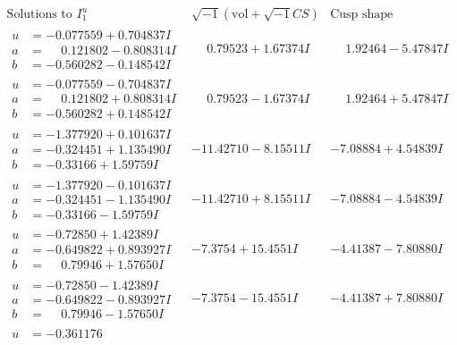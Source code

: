 \documentclass[1p]{elsarticle_modified}
\theoremstyle{definition}
\newcommand{\I}{\sqrt{-1}}
\begin{document}
$$\begin{array}{c|c|c}  
\text{Solutions to }I^u_{1}& \I (\text{vol} + \sqrt{-1}CS) & \text{Cusp shape}\\
 \hline 
\begin{aligned}
u &= -0.077559 + 0.704837 I \\
a &= \phantom{-}0.121802 - 0.808314 I \\
b &= -0.560282 - 0.148542 I\end{aligned}
 & \phantom{-}0.79523 + 1.67374 I & \phantom{-}1.92464 - 5.47847 I \\ \hline\begin{aligned}
u &= -0.077559 - 0.704837 I \\
a &= \phantom{-}0.121802 + 0.808314 I \\
b &= -0.560282 + 0.148542 I\end{aligned}
 & \phantom{-}0.79523 - 1.67374 I & \phantom{-}1.92464 + 5.47847 I \\ \hline\begin{aligned}
u &= -1.377920 + 0.101637 I \\
a &= -0.324451 + 1.135490 I \\
b &= -0.33166 + 1.59759 I\end{aligned}
 & -11.42710 - 8.15511 I & -7.08884 + 4.54839 I \\ \hline\begin{aligned}
u &= -1.377920 - 0.101637 I \\
a &= -0.324451 - 1.135490 I \\
b &= -0.33166 - 1.59759 I\end{aligned}
 & -11.42710 + 8.15511 I & -7.08884 - 4.54839 I \\ \hline\begin{aligned}
u &= -0.72850 + 1.42389 I \\
a &= -0.649822 + 0.893927 I \\
b &= \phantom{-}0.79946 + 1.57650 I\end{aligned}
 & -7.3754 + 15.4551 I & -4.41387 - 7.80880 I \\ \hline\begin{aligned}
u &= -0.72850 - 1.42389 I \\
a &= -0.649822 - 0.893927 I \\
b &= \phantom{-}0.79946 - 1.57650 I\end{aligned}
 & -7.3754 - 15.4551 I & -4.41387 + 7.80880 I \\ \hline\begin{aligned}
u &= -0.361176\phantom{ +0.000000I} \\

\end{aligned}
\end{array}$$
\end{document}
